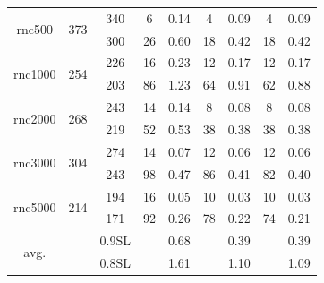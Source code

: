 \documentclass[10pt,journal]{IEEEtran}
\begin{document}
\begin{table}[!t]
\begin{tabular}{c|c|c|c|c|c|c|c|c}
\hline
\multicolumn{1}{c|}{\multirow{2}{*}{\hspace*{-0.5em}rnc500\hspace*{-0.5em}}}            &\multicolumn{1}{c|}{\multirow{2}{*}{373}}    &340   &6  &0.14  &4  &0.09   &4  &0.09   \\
  &     &300  &26  &0.60  &18   &0.42  &18  &0.42 \\

\hline
\multicolumn{1}{c|}{\multirow{2}{*}{\hspace*{-1em}rnc1000\hspace*{-1em}}}              &\multicolumn{1}{c|}{\multirow{2}{*}{254}}   &226    &16 &0.23   &12   &0.17 &12   &0.17  \\
   &     &203   &86  &1.23  &64  &0.91  &62  &0.88 \\

\hline
\multicolumn{1}{c|}{\multirow{2}{*}{\hspace*{-1em}rnc2000\hspace*{-1em}}}            &\multicolumn{1}{c|}{\multirow{2}{*}{268}}    &243    &14  &0.14  &8   &0.08  &8 &0.08   \\
  &    &219   &52  &0.53  &38    &0.38  &38 &0.38  \\

\hline
\multicolumn{1}{c|}{\multirow{2}{*}{\hspace*{-1em}rnc3000\hspace*{-1em}}}           &\multicolumn{1}{c|}{\multirow{2}{*}{304}}  &274  &14  &0.07  &12   &0.06   &12   &0.06  \\
   &     &243   &98  &0.47   &86   &0.41   &82  &0.40 \\

\hline
\multicolumn{1}{c|}{\multirow{2}{*}{\hspace*{-1em}rnc5000\hspace*{-1em}}}           &\multicolumn{1}{c|}{\multirow{2}{*}{214}}    &194  &16  &0.05  &10  &0.03   &10  &0.03    \\
   &     &171   &92   &0.26   &78   &0.22   &74  &0.21  \\
\hline

\multicolumn{1}{c|}{\multirow{2}{*}{\hspace*{-1em}avg.\hspace*{-1em}}}           &\multicolumn{1}{c|}{\multirow{2}{*}{}}    &\hspace*{-1em}0.9SL\hspace*{-1em}  &   &0.68   &  &0.39   &   &0.39    \\
   &     &\hspace*{-1em}0.8SL\hspace*{-1em}   &    &1.61    &   &1.10   &   &1.09  \\
\hline
\hline
\end{tabular}
\label{table:VPCTC}
\end{table}
\end{document}
